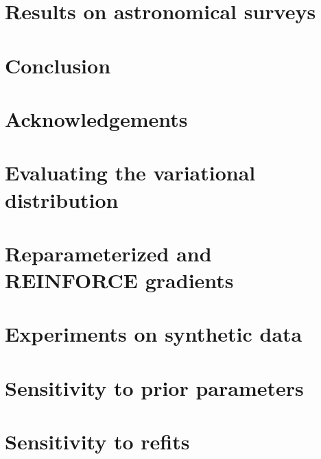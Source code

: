 \documentclass{article}
\begin{document}
\section{Results on astronomical surveys}




\section{Conclusion}
\label{sec:conclusion}




\section*{Acknowledgements}



\newpage

\appendix
\renewcommand\thefigure{A.\arabic{figure}}
\renewcommand\thetable{A.\arabic{table}}
\setcounter{figure}{0}
\setcounter{table}{0}


\section{Evaluating the variational distribution}
\label{sec:eval_var_distr}


\section{Reparameterized and REINFORCE gradients}
\label{sec:reparam_details}


\section{Experiments on synthetic data}


\section{Sensitivity to prior parameters}
\label{sec:prior_sensitivity}


\section{Sensitivity to refits}
\label{sec:refits}

\end{document}
